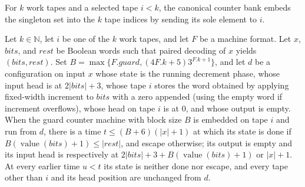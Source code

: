 \begin{definition}
\label{Turing.MachineFormat.canonCounterBank}
\leanok
For $k$ work tapes and a selected tape $i<k$, the canonical counter bank embeds the
singleton set into the $k$ tape indices by sending its sole element to $i$.
\end{definition}

\begin{lemma}
\label{Turing.MachineFormat.canonGuard_onBank}
\leanok
{}
Let $k\in\mathbb N$, let $i$ be one of the $k$ work tapes, and let $F$ be a machine
format. Let $x$, $bits$, and $rest$ be Boolean words such that paired decoding of $x$
yields $(bits,rest)$. Set $B=\max\{F.guard,(4F.k+5)3^{F.k+1}\}$, and let $d$ be a
configuration on input $x$ whose state is the running decrement phase, whose input head
is at $2|bits|+3$, whose tape $i$ stores the word obtained by applying fixed-width
increment to $bits$ with a zero appended (using the empty word if increment overflows),
whose head on tape $i$ is at $0$, and whose output is empty. When the guard counter
machine with block size $B$ is embedded on tape $i$ and run from $d$, there is a time
$t\le (B+6)(|x|+1)$ at which its state is done if $B(\operatorname{value}(bits)+1)\le
|rest|$, and escape otherwise; its output is empty and its input head is respectively at
$2|bits|+3+B(\operatorname{value}(bits)+1)$ or $|x|+1$. At every earlier time $u<t$ its
state is neither done nor escape, and every tape other than $i$ and its head position
are unchanged from $d$.
\end{lemma}

